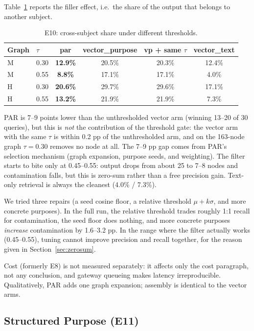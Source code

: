 \documentclass[11pt]{article}
\begin{document}
Table~\ref{tab:e10filler} reports the filler effect, i.e.\ the share of the output that belongs
to another subject.

\begin{table}[t]
  \centering
  \small
  \begin{tabular}{@{}llcccc@{}}
    \toprule
    Graph & $\tau$ & par & vector\_purpose & vp + same $\tau$ & vector\_text \\
    \midrule
    M & 0.30 & \textbf{12.9\%} & 20.5\% & 20.3\% & 12.4\% \\
    M & 0.55 & \textbf{8.8\%} & 17.1\% & 17.1\% & 4.0\% \\
    H & 0.30 & \textbf{20.6\%} & 29.7\% & 29.6\% & 17.1\% \\
    H & 0.55 & \textbf{13.2\%} & 21.9\% & 21.9\% & 7.3\% \\
    \bottomrule
  \end{tabular}
  \caption{E10: cross-subject share under different thresholds.}\label{tab:e10filler}
\end{table}

PAR is 7--9 points lower than the unthresholded vector arm (winning 13--20 of 30 queries), but
this is \emph{not} the contribution of the threshold gate: the vector arm with the same $\tau$ is
within 0.2 pp of the unthresholded arm, and on the 163-node graph $\tau=0.30$ removes no node at
all. The 7--9 pp gap comes from PAR's selection mechanism (graph expansion, purpose seeds, and
weighting). The filter starts to bite only at 0.45--0.55: output drops from about 25 to 7--8 nodes
and contamination falls, but this is zero-sum rather than a free precision gain. Text-only
retrieval is always the cleanest (4.0\% / 7.3\%).

We tried three repairs (a seed cosine floor, a relative threshold $\mu+k\sigma$, and more
concrete purposes). In the full run, the relative threshold trades roughly 1:1 recall for
contamination, the seed floor does nothing, and more concrete purposes \emph{increase}
contamination by 1.6--3.2 pp. In the range where the filter actually works (0.45--0.55), tuning
cannot improve precision and recall together, for the reason given in Section~\ref{sec:zerosum}.

Cost (formerly E8) is not measured separately: it affects only the cost paragraph, not any
conclusion, and gateway queueing makes latency irreproducible. Qualitatively, PAR adds one graph
expansion; assembly is identical to the vector arms.

\subsection{Structured Purpose (E11)}
\label{sec:e11}
\end{document}
